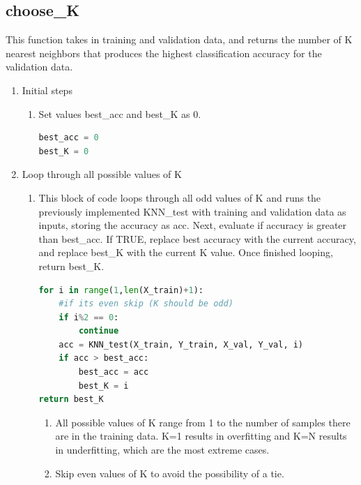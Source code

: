 \documentclass[11pt]{article}
\theoremstyle{definition}
\begin{document}
\subsection{choose\_K}
This function takes in training and validation data, and returns the number of \textsf{K} nearest neighbors that produces the highest classification accuracy for the validation data.
\begin{enumerate}
    \item Initial steps
    \begin{enumerate}
        \item Set values \textsf{best\_acc} and \textsf{best\_K} as 0.
\begin{lstlisting}[language=python, frame=single]
best_acc = 0
best_K = 0
\end{lstlisting}
    \end{enumerate}
    \item Loop through all possible values of \textsf{K}
    \begin{enumerate}
        \item This block of code loops through all odd values of \textsf{K} and runs the previously implemented \textsf{KNN\_test} with training and validation data as inputs, storing the accuracy as \textsf{acc}. Next, evaluate if accuracy is greater than \textsf{best\_acc}. If TRUE, replace best accuracy with the current accuracy, and replace \textsf{best\_K} with the current \textsf{K} value. Once finished looping, return \textsf{best\_K}.
\begin{lstlisting}[language=python, frame=single]
for i in range(1,len(X_train)+1):
    #if its even skip (K should be odd)
    if i%2 == 0:
    	continue
    acc = KNN_test(X_train, Y_train, X_val, Y_val, i)
    if acc > best_acc:
    	best_acc = acc
    	best_K = i
return best_K
\end{lstlisting}
        \begin{enumerate}
            \item All possible values of \textsf{K} range from 1 to the number of samples there are in the training data. \textsf{K=1} results in overfitting and \textsf{K=N} results in underfitting, which are the most extreme cases.
            \item Skip even values of \textsf{K} to avoid the possibility of a tie.
        \end{enumerate}
    \end{enumerate}
\end{enumerate}
\end{document}
